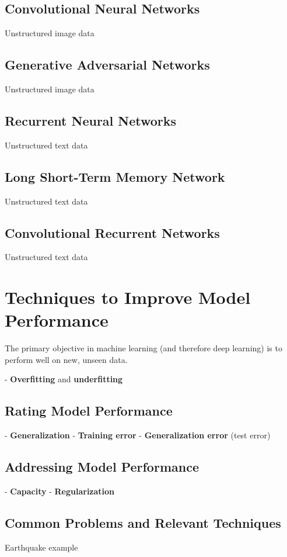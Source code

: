\subsection{Convolutional Neural Networks}
Unstructured image data

\subsection{Generative Adversarial Networks}
Unstructured image data

\subsection{Recurrent Neural Networks}
Unstructured text data

\subsection{Long Short-Term Memory Network}
Unstructured text data

\subsection{Convolutional Recurrent Networks}
Unstructured text data

\section{Techniques to Improve Model Performance} %

The primary objective in machine learning (and therefore deep learning) is to perform well on new, unseen data. 

- \textbf{Overfitting} and \textbf{underfitting}

\subsection{Rating Model Performance}
- \textbf{Generalization}
- \textbf{Training error}  
- \textbf{Generalization error} (test error)

\subsection{Addressing Model Performance}
- \textbf{Capacity}
- \textbf{Regularization}

\subsection{Common Problems and Relevant Techniques}

Earthquake example